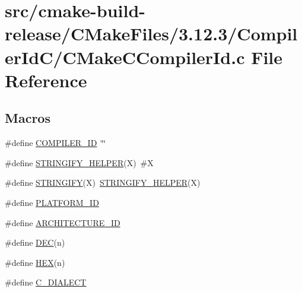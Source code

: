 \hypertarget{cmake-build-release_2CMakeFiles_23_812_83_2CompilerIdC_2CMakeCCompilerId_8c}{}\section{src/cmake-\/build-\/release/\+C\+Make\+Files/3.12.3/\+Compiler\+Id\+C/\+C\+Make\+C\+Compiler\+Id.c File Reference}
\label{cmake-build-release_2CMakeFiles_23_812_83_2CompilerIdC_2CMakeCCompilerId_8c}
\subsection*{Macros}
\begin{DoxyCompactItemize}
\item 
\#define \hyperlink{cmake-build-release_2CMakeFiles_23_812_83_2CompilerIdC_2CMakeCCompilerId_8c_a81dee0709ded976b2e0319239f72d174}{C\+O\+M\+P\+I\+L\+E\+R\+\_\+\+ID}~\char`\"{}\char`\"{}
\item 
\#define \hyperlink{cmake-build-release_2CMakeFiles_23_812_83_2CompilerIdC_2CMakeCCompilerId_8c_a2ae9b72bb13abaabfcf2ee0ba7d3fa1d}{S\+T\+R\+I\+N\+G\+I\+F\+Y\+\_\+\+H\+E\+L\+P\+ER}(X)~\#X
\item 
\#define \hyperlink{cmake-build-release_2CMakeFiles_23_812_83_2CompilerIdC_2CMakeCCompilerId_8c_a43e1cad902b6477bec893cb6430bd6c8}{S\+T\+R\+I\+N\+G\+I\+FY}(X)~\hyperlink{cmake-build-release_2CMakeFiles_23_812_83_2CompilerIdCXX_2CMakeCXXCompilerId_8cpp_a2ae9b72bb13abaabfcf2ee0ba7d3fa1d}{S\+T\+R\+I\+N\+G\+I\+F\+Y\+\_\+\+H\+E\+L\+P\+ER}(X)
\item 
\#define \hyperlink{cmake-build-release_2CMakeFiles_23_812_83_2CompilerIdC_2CMakeCCompilerId_8c_adbc5372f40838899018fadbc89bd588b}{P\+L\+A\+T\+F\+O\+R\+M\+\_\+\+ID}
\item 
\#define \hyperlink{cmake-build-release_2CMakeFiles_23_812_83_2CompilerIdC_2CMakeCCompilerId_8c_aba35d0d200deaeb06aee95ca297acb28}{A\+R\+C\+H\+I\+T\+E\+C\+T\+U\+R\+E\+\_\+\+ID}
\item 
\#define \hyperlink{cmake-build-release_2CMakeFiles_23_812_83_2CompilerIdC_2CMakeCCompilerId_8c_ad1280362da42492bbc11aa78cbf776ad}{D\+EC}(n)
\item 
\#define \hyperlink{cmake-build-release_2CMakeFiles_23_812_83_2CompilerIdC_2CMakeCCompilerId_8c_a46d5d95daa1bef867bd0179594310ed5}{H\+EX}(n)
\item 
\#define \hyperlink{cmake-build-release_2CMakeFiles_23_812_83_2CompilerIdC_2CMakeCCompilerId_8c_a07f8e5783674099cd7f5110e22a78cdb}{C\+\_\+\+D\+I\+A\+L\+E\+CT}
\end{DoxyCompactItemize}
